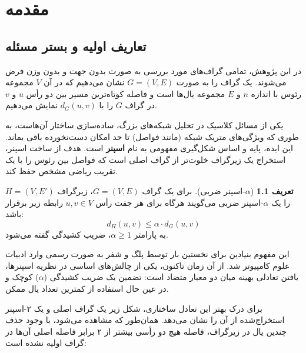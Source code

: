\documentclass[11pt,a4paper]{report}
\theoremstyle{plain}
\theoremstyle{definition}
\newtheorem{defn}[thm]{\normalsize تعریف}
\theoremstyle{remark}
\begin{document}
\chapter{مقدمه}

\section{تعاریف اولیه و بستر مسئله}
در این پژوهش، تمامی گراف‌های مورد بررسی به صورت بدون جهت و بدون وزن فرض می‌شوند. یک گراف را به صورت $G = (V,E)$ نشان می‌دهیم که در آن $V$ مجموعه رئوس با اندازه $n$ و $E$ مجموعه یال‌ها است و فاصله کوتاه‌ترین مسیر بین دو رأس $u$ و $v$ در گراف $G$ را با $d_G(u,v)$ نمایش می‌دهیم. 

یکی از مسائل کلاسیک در تحلیل شبکه‌های بزرگ، ساده‌سازی ساختار آن‌هاست، به طوری که ویژگی‌های متریک شبکه (مانند فواصل) تا حد امکان دست‌نخورده باقی بماند. این ایده، پایه و اساس شکل‌گیری مفهومی به نام \textbf{اسپنر} است. هدف از ساخت اسپنر، استخراج یک زیرگراف خلوت‌تر از گراف اصلی است که فواصل بین رئوس را با یک تقریب ریاضی مشخص حفظ کند.

\begin{defn}[$\alpha$-اسپنر ضربی]
برای یک گراف $G = (V,E)$، زیرگراف $H = (V, E')$ را یک $\alpha$-اسپنر ضربی می‌گویند هرگاه برای هر جفت رأس $u, v \in V$ رابطه زیر برقرار باشد:
\[ d_H(u,v) \le \alpha \cdot d_G(u,v) \]
به پارامتر $\alpha \ge 1$، ضریب کشیدگی گفته می‌شود.
\end{defn}

این مفهوم بنیادین برای نخستین بار توسط پلگ و شفر \cite{peleg1989graph} به صورت رسمی وارد ادبیات علوم کامپیوتر شد. از آن زمان تاکنون، یکی از چالش‌های اساسی در نظریه اسپنرها، یافتن تعادلی بهینه میان دو معیار متضاد است: تضمین یک ضریب کشیدگی ($\alpha$) کوچک و در عین حال استفاده از کمترین تعداد یال ممکن.

برای درک بهتر این تعادل ساختاری، شکل زیر یک گراف اصلی و یک ۲-اسپنر استخراج‌شده از آن را نشان می‌دهد. همان‌طور که مشاهده می‌شود، با وجود حذف چندین یال در زیرگراف، فاصله هیچ دو رأسی بیشتر از ۲ برابر فاصله اصلی آن‌ها در گراف اولیه نشده است:
\end{document}
